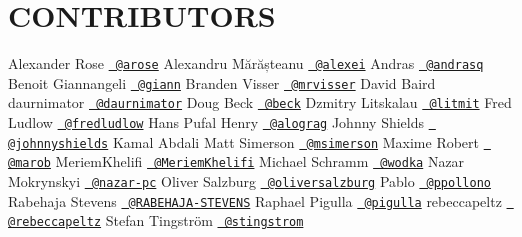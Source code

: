 \chapter{CONTRIBUTORS}
\hypertarget{md__c_1_2_users_2_s_t_r_i_d_e_r_2source_2repos_2_internal_a_p_i_2_internal_a_p_i_2wwwroot_2lib_23610c794045ec0dfc47482bb9654d2d7}{}\label{md__c_1_2_users_2_s_t_r_i_d_e_r_2source_2repos_2_internal_a_p_i_2_internal_a_p_i_2wwwroot_2lib_23610c794045ec0dfc47482bb9654d2d7}
Alexander Rose \href{https://github.com/arose}{\texttt{ @arose}} Alexandru Mărășteanu \href{https://github.com/alexei}{\texttt{ @alexei}} Andras \href{https://github.com/andrasq}{\texttt{ @andrasq}} Benoit Giannangeli \href{https://github.com/giann}{\texttt{ @giann}} Branden Visser \href{https://github.com/mrvisser}{\texttt{ @mrvisser}} David Baird daurnimator \href{https://github.com/daurnimator}{\texttt{ @daurnimator}} Doug Beck \href{https://github.com/beck}{\texttt{ @beck}} Dzmitry Litskalau \href{https://github.com/litmit}{\texttt{ @litmit}} Fred Ludlow \href{https://github.com/fredludlow}{\texttt{ @fredludlow}} Hans Pufal Henry \href{https://github.com/alograg}{\texttt{ @alograg}} Johnny Shields \href{https://github.com/johnnyshields}{\texttt{ @johnnyshields}} Kamal Abdali Matt Simerson \href{https://github.com/msimerson}{\texttt{ @msimerson}} Maxime Robert \href{https://github.com/marob}{\texttt{ @marob}} Meriem\+Khelifi \href{https://github.com/MeriemKhelifi}{\texttt{ @\+Meriem\+Khelifi}} Michael Schramm \href{https://github.com/wodka}{\texttt{ @wodka}} Nazar Mokrynskyi \href{https://github.com/nazar-pc}{\texttt{ @nazar-\/pc}} Oliver Salzburg \href{https://github.com/oliversalzburg}{\texttt{ @oliversalzburg}} Pablo \href{https://github.com/ppollono}{\texttt{ @ppollono}} Rabehaja Stevens \href{https://github.com/RABEHAJA-STEVENS}{\texttt{ @\+RABEHAJA-\/STEVENS}} Raphael Pigulla \href{https://github.com/pigulla}{\texttt{ @pigulla}} rebeccapeltz \href{https://github.com/rebeccapeltz}{\texttt{ @rebeccapeltz}} Stefan Tingström \href{https://github.com/stingstrom}{\texttt{ @stingstrom}} 